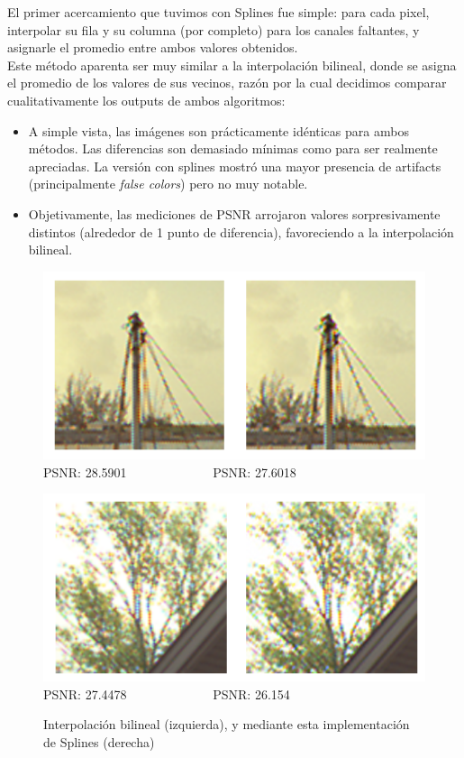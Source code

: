 \documentclass[a4paper]{article}
\begin{document}
El primer acercamiento que tuvimos con Splines fue simple: para cada pixel, interpolar su fila y su columna (por completo) para los canales faltantes, y asignarle el promedio entre ambos valores obtenidos. \\
Este método aparenta ser muy similar a la interpolación bilineal, donde se asigna el promedio de los valores de sus vecinos, razón por la cual decidimos comparar cualitativamente los outputs de ambos algoritmos:
\begin{itemize}
\item A simple vista, las imágenes son prácticamente idénticas para ambos métodos. Las diferencias son demasiado mínimas como para ser realmente apreciadas. La versión con splines mostró una mayor presencia de artifacts (principalmente \textit{false colors}) pero no muy notable.
\item Objetivamente, las mediciones de PSNR arrojaron valores sorpresivamente distintos (alrededor de 1 punto de diferencia), favoreciendo a la interpolación bilineal.
\end{itemize}

\begin{figure}[h!]
	\begin{center}
	    \includegraphics[scale=0.47]{imagenes/Splines/RecortesSplines/promedio/barcos.png}\\
	    PSNR: 28.5901 \ \ \ \ \ \ \ \ \ \ \ \ \ PSNR: 27.6018
	\end{center}
	\begin{center}
	    \includegraphics[scale=0.47]{imagenes/Splines/RecortesSplines/promedio/arbol.png}\\
	    PSNR: 27.4478 \ \ \ \ \ \ \ \ \ \ \ \ \ PSNR: 26.154
	\end{center}
	\caption{Interpolación bilineal (izquierda), y mediante esta implementación de Splines (derecha)}
	\label{splines2}
\end{figure}
\end{document}
